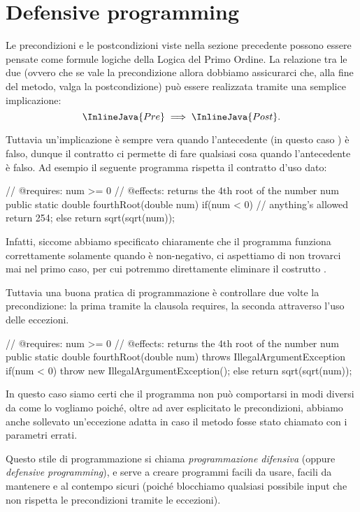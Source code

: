 \section{Defensive programming}
Le precondizioni e le postcondizioni viste nella sezione precedente possono essere pensate come formule logiche della Logica del Primo Ordine. La relazione tra le due (ovvero che se vale la precondizione allora dobbiamo assicurarci che, alla fine del metodo, valga la postcondizione) può essere realizzata tramite una semplice implicazione: \[
    \InlineJava{Pre} \implies \InlineJava{Post}.    
\]

Tuttavia un'implicazione è sempre vera quando l'antecedente (in questo caso ) è falso, dunque il contratto ci permette di fare qualsiasi cosa quando l'antecedente è falso. Ad esempio il seguente programma rispetta il contratto d'uso dato:
\begin{Java}
    // @requires: num >= 0
    // @effects: returns the 4th root of the number num
    public static double fourthRoot(double num) {
        if(num < 0) {       // anything's allowed
            return 254;
        } else {
            return sqrt(sqrt(num));
        }
    }
\end{Java}
Infatti, siccome abbiamo specificato chiaramente che il programma funziona correttamente solamente quando  è non-negativo, ci aspettiamo di non trovarci mai nel primo caso, per cui potremmo direttamente eliminare il costrutto .

Tuttavia una buona pratica di programmazione è controllare due volte la precondizione: la prima tramite la clausola requires, la seconda attraverso l'uso delle eccezioni.
\begin{Java}
    // @requires: num >= 0
    // @effects: returns the 4th root of the number num
    public static double fourthRoot(double num)
                throws IllegalArgumentException {
        if(num < 0) {
            throw new IllegalArgumentException();
        } else {
            return sqrt(sqrt(num));
        }
    }
\end{Java}
In questo caso siamo certi che il programma non può comportarsi in modi diversi da come lo vogliamo poiché, oltre ad aver esplicitato le precondizioni, abbiamo anche sollevato un'eccezione adatta in caso il metodo fosse stato chiamato con i parametri errati.

Questo stile di programmazione si chiama \emph{programmazione difensiva} (oppure \emph{defensive programming}), e serve a creare programmi facili da usare, facili da mantenere e al contempo sicuri (poiché blocchiamo qualsiasi possibile input che non rispetta le precondizioni tramite le eccezioni).

